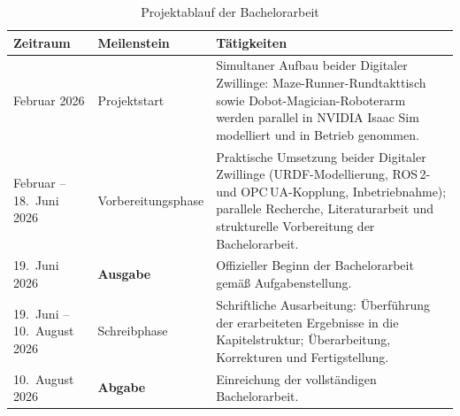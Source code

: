 \begin{table}[H]
\centering
\caption{Projektablauf der Bachelorarbeit}
\label{tab:Zeitplan}
\renewcommand{\arraystretch}{1.5}
\begin{tabularx}{\textwidth}{p{4.2cm} p{3.0cm} X}
\toprule
\textbf{Zeitraum} & \textbf{Meilenstein} & \textbf{Tätigkeiten} \\
\midrule
Februar 2026 & Projektstart
  & Simultaner Aufbau beider Digitaler Zwillinge: Maze-Runner-Rundtakttisch sowie Dobot-Magician-Roboterarm werden parallel in NVIDIA Isaac Sim modelliert und in Betrieb genommen. \\
Februar -- 18.\ Juni 2026 & Vorbereitungsphase
  & Praktische Umsetzung beider Digitaler Zwillinge (URDF-Modellierung, ROS\,2- und OPC\,UA-Kopplung, Inbetriebnahme); parallele Recherche, Literaturarbeit und strukturelle Vorbereitung der Bachelorarbeit. \\
19.\ Juni 2026 & \textbf{Ausgabe}
  & Offizieller Beginn der Bachelorarbeit gemäß Aufgabenstellung. \\
19.\ Juni -- 10.\ August 2026 & Schreibphase
  & Schriftliche Ausarbeitung: Überführung der erarbeiteten Ergebnisse in die Kapitelstruktur; Überarbeitung, Korrekturen und Fertigstellung. \\
10.\ August 2026 & \textbf{Abgabe}
  & Einreichung der vollständigen Bachelorarbeit. \\
\bottomrule
\end{tabularx}
\end{table}
